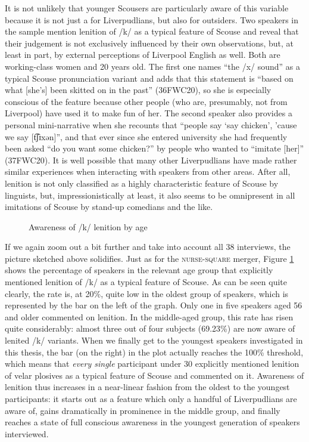It is not unlikely that younger Scousers are particularly aware of this variable because it is not just a  for Liverpudlians, but also for outsiders.
Two speakers in the sample mention lenition of /k/ as a typical feature of Scouse and reveal that their judgement is not exclusively influenced by their own observations, but, at least in part, by external perceptions of Liverpool English as well.
Both are working-class women and 20 years old.
The first one names ``the /x/ sound'' as a typical Scouse pronunciation variant and adds that this statement is ``based on what [she's] been skitted on in the past'' (36FWC20), so she is especially conscious of the feature because other people (who are, presumably, not from Liverpool) have used it to make fun of her.
The second speaker also provides a personal mini-narrative when she recounts that ``people say `say chicken', 'cause we say [t͡ʃɪxən]'', and that ever since she entered university she had frequently been asked ``do you want some chicken?'' by people who wanted to ``imitate [her]'' (37FWC20).
It is well possible that many other Liverpudlians have made rather similar experiences when interacting with speakers from other areas.
After all, lenition is not only classified as a highly characteristic feature of Scouse by linguists, but, impressionistically at least, it also seems to be omnipresent in all imitations of Scouse by stand-up comedians and the like.

\begin{figure}[h]
	\centering
		\resizebox{.49\linewidth}{!}{} 
	\caption{Awareness of /k/ lenition by age}
	\label{fig.aware.k}
\end{figure}

If we again zoom out a bit further and take into account all 38 interviews, the picture sketched above solidifies.
Just as for the \textsc{nurse}-\textsc{square} merger, Figure \ref{fig.aware.k} shows the percentage of speakers in the relevant age group that explicitly mentioned lenition of /k/ as a typical feature of Scouse.
As can be seen quite clearly, the rate is, at 20\%, quite low in the oldest group of speakers, which is represented by the bar on the left of the graph.
Only one in five speakers aged 56 and older commented on lenition.
In the middle-aged group, this rate has risen quite considerably: almost three out of four subjects (69.23\%) are now aware of lenited /k/ variants.
When we finally get to the youngest speakers investigated in this thesis, the bar (on the right) in the plot actually reaches the 100\% threshold, which means that \emph{every single} participant under 30 explicitly mentioned lenition of velar plosives as a typical feature of Scouse and commented on it.
Awareness of lenition thus increases in a near-linear fashion from the oldest to the youngest participants: it starts out as a feature which only a handful of Liverpudlians are aware of, gains dramatically in prominence in the middle group, and finally reaches a state of full conscious awareness in the youngest generation of speakers interviewed.

